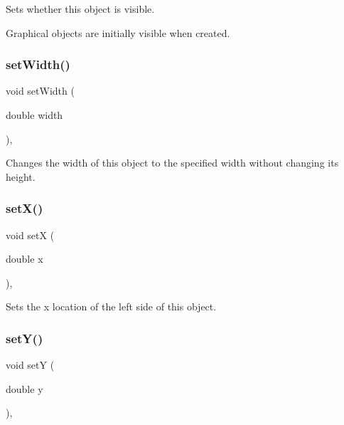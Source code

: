 Sets whether this object is visible. 

Graphical objects are initially visible when created. \mbox{\label{classsgl_1_1GObject_aa3f3fba4cb131baa8696ba01e3bceca1}} 
\subsubsection{\texorpdfstring{set\+Width()}{setWidth()}}
{\footnotesize\ttfamily void set\+Width (\begin{DoxyParamCaption}\item[{double}]{width }\end{DoxyParamCaption})\hspace{0.3cm}{\ttfamily [virtual]}, {\ttfamily [inherited]}}



Changes the width of this object to the specified width without changing its height. 

\mbox{\label{classsgl_1_1GObject_a9c18fcc579333bf9653d13ad2b372e39}} 
\subsubsection{\texorpdfstring{set\+X()}{setX()}}
{\footnotesize\ttfamily void setX (\begin{DoxyParamCaption}\item[{double}]{x }\end{DoxyParamCaption})\hspace{0.3cm}{\ttfamily [virtual]}, {\ttfamily [inherited]}}



Sets the x location of the left side of this object. 

\mbox{\label{classsgl_1_1GObject_a7d57e2a5c35d27feb58fd498a3cf82b9}} 
\subsubsection{\texorpdfstring{set\+Y()}{setY()}}
{\footnotesize\ttfamily void setY (\begin{DoxyParamCaption}\item[{double}]{y }\end{DoxyParamCaption})\hspace{0.3cm}{\ttfamily [virtual]}, {\ttfamily [inherited]}}



